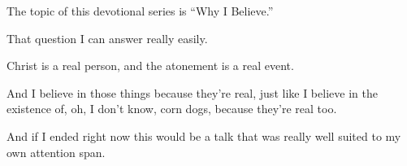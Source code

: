 		\begin{compactitem}
				
			\item The topic of this devotional series is ``Why I Believe.''
				\begin{compactitem}
					\item That question I can answer really easily. 
					\item Christ is a real person, and the atonement is a real event.
					\item And I believe in those things because they're real, just like I believe in the existence of, oh, I don't know, corn dogs, because they're real too.
					\item And if I ended right now this would be a talk that was really well suited to my own attention span.
				\end{compactitem}
				

\end{compactitem}
